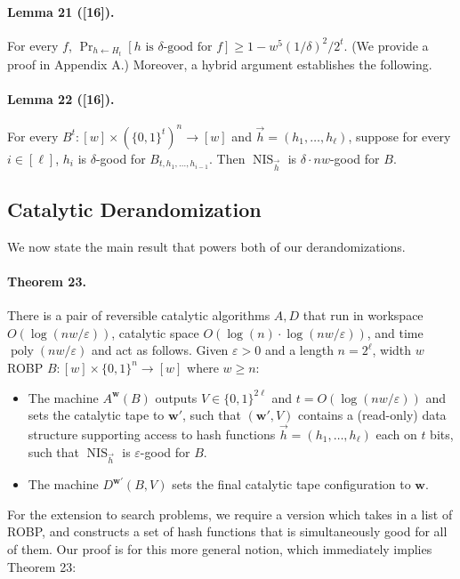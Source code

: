 \paragraph{Lemma 21 ([16]).} For every $f$, $\Pr_{h\leftarrow H_t}[h\text{ is }\delta\text{-good for }f]\geq1-w^5(1/\delta)^2/2^t$.
(We provide a proof in Appendix A.) Moreover, a hybrid argument establishes the following.
\paragraph{Lemma 22 ([16]).} For every $B^t:[w]\times(\{0,1\}^t)^n\to[w]$ and $\vec h=(h_1,\ldots,h_\ell)$, suppose for every $i\in[\ell]$, $h_i$ is $\delta$-good for $B_{t,h_1,\ldots,h_{i-1}}$. Then $\operatorname{NIS}_{\vec h}$ is $\delta\cdot nw$-good for $B$.
\subsection*{Catalytic Derandomization}
We now state the main result that powers both of our derandomizations.
\paragraph{Theorem 23.} There is a pair of reversible catalytic algorithms $A,D$ that run in workspace $O(\log(nw/\varepsilon))$, catalytic space $O(\log(n)\cdot\log(nw/\varepsilon))$, and time $\operatorname{poly}(nw/\varepsilon)$ and act as follows. Given $\varepsilon>0$ and a length $n=2^\ell$, width $w$ ROBP $B:[w]\times\{0,1\}^n\to[w]$ where $w\geq n$:
\begin{itemize}
\item The machine $A^{\mathbf w}(B)$ outputs $V\in\{0,1\}^{2\ell}$ and $t=O(\log(nw/\varepsilon))$ and sets the catalytic tape to $\mathbf w'$, such that $(\mathbf w',V)$ contains a (read-only) data structure supporting access to hash functions $\vec h=(h_1,\ldots,h_\ell)$ each on $t$ bits, such that $\operatorname{NIS}_{\vec h}$ is $\varepsilon$-good for $B$.
\item The machine $D^{\mathbf w'}(B,V)$ sets the final catalytic tape configuration to $\mathbf w$.
\end{itemize}
For the extension to search problems, we require a version which takes in a list of ROBP, and constructs a set of hash functions that is simultaneously good for all of them. Our proof is for this more general notion, which immediately implies Theorem 23:
